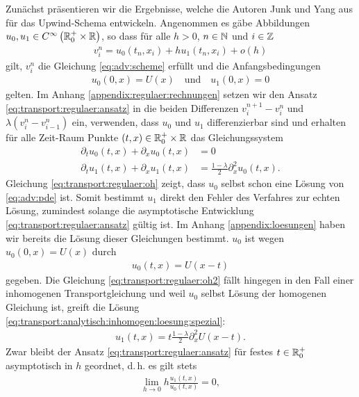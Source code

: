 Zunächst präsentieren wir die Ergebnisse, welche die Autoren Junk und Yang aus \cite{Junk2004} für das Upwind-Schema entwickeln.
Angenommen es gäbe Abbildungen $u_0, u_1 \in C^\infty\left( \mathbb R^+_0 \times \mathbb R \right)$, so dass für alle $h > 0$, $n \in \mathbb N$ und $i \in \mathbb Z$
\begin{align}\label{eq:transport:regulaer:ansatz}
v^n_i = u_0(t_n,x_i) + h u_1(t_n,x_i) + o(h)
\end{align}
gilt, $v^n_i$ die Gleichung \eqref{eq:adv:scheme} erfüllt und die Anfangsbedingungen
\begin{align}\label{eq:transport:regulaer:anfangsbedingungen}
u_0(0,x) = U(x) \quad \text{und} \quad u_1(0, x) = 0
\end{align}
gelten.
Im Anhang \ref{appendix:regulaer:rechnungen} setzen wir den Ansatz \eqref{eq:transport:regulaer:ansatz} in die beiden Differenzen $v^{n+1}_i - v^n_i$ und $\lambda ( v^n_i - v^n_{i-1} )$ ein, verwenden, dass $u_0$ und $u_1$ differenzierbar sind und erhalten für alle Zeit-Raum Punkte $(t,x) \in \mathbb R^+_0 \times \mathbb R$ das Gleichungssystem 
\begin{align}
\label{eq:transport:regulaer:oh}
\partial_t u_0(t,x) + \partial_x u_0(t,x) &= 0\\
\label{eq:transport:regulaer:oh2}
\partial_t u_1(t,x) + \partial_x u_1(t,x) &= \frac{1-\lambda}{2} \partial^2_x u_0(t,x).
\end{align}
Gleichung \eqref{eq:transport:regulaer:oh} zeigt, dass $u_0$ selbst schon eine Lösung von \eqref{eq:adv:pde} ist.
Somit bestimmt $u_1$ direkt den Fehler des Verfahres zur echten Lösung, zumindest solange die asymptotische Entwicklung \eqref{eq:transport:regulaer:ansatz} gültig ist.
Im Anhang \ref{appendix:loesungen} haben wir bereits die Lösung dieser Gleichungen bestimmt.
$u_0$ ist wegen $u_0(0,x) = U(x)$ durch
\begin{align*}
u_0(t,x) = U(x-t)
\end{align*}
gegeben.
Die Gleichung \eqref{eq:transport:regulaer:oh2} fällt hingegen in den Fall einer inhomogenen Transportgleichung und weil $u_0$ selbst Lösung der homogenen Gleichung ist, greift die Lösung \eqref{eq:transport:analytisch:inhomogen:loesung:spezial}:
\begin{align*}
u_1(t,x) = t \frac{1-\lambda}{2} \partial^2_x U(x-t).
\end{align*}
Zwar bleibt der Ansatz \eqref{eq:transport:regulaer:ansatz} für festes $t \in \mathbb R^+_0$ asymptotisch in $h$ geordnet, d.\,h. es gilt stets
\begin{align*}
\lim_{h \to 0} h \frac{u_1(t,x)}{u_0(t,x)} = 0,
\end{align*}
